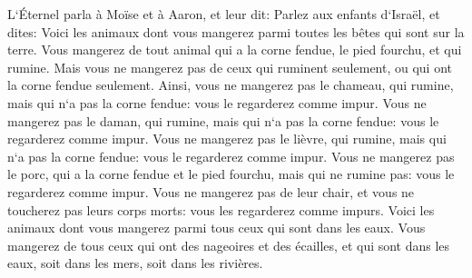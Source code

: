\verse L`Éternel parla à Moïse et à Aaron, et leur dit: 
\verse Parlez aux enfants d`Israël, et dites: Voici les animaux dont vous mangerez parmi toutes les bêtes qui sont sur la terre. 
\verse Vous mangerez de tout animal qui a la corne fendue, le pied fourchu, et qui rumine. 
\verse Mais vous ne mangerez pas de ceux qui ruminent seulement, ou qui ont la corne fendue seulement. Ainsi, vous ne mangerez pas le chameau, qui rumine, mais qui n`a pas la corne fendue: vous le regarderez comme impur. 
\verse Vous ne mangerez pas le daman, qui rumine, mais qui n`a pas la corne fendue: vous le regarderez comme impur. 
\verse Vous ne mangerez pas le lièvre, qui rumine, mais qui n`a pas la corne fendue: vous le regarderez comme impur. 
\verse Vous ne mangerez pas le porc, qui a la corne fendue et le pied fourchu, mais qui ne rumine pas: vous le regarderez comme impur. 
\verse Vous ne mangerez pas de leur chair, et vous ne toucherez pas leurs corps morts: vous les regarderez comme impurs. 
\verse Voici les animaux dont vous mangerez parmi tous ceux qui sont dans les eaux. Vous mangerez de tous ceux qui ont des nageoires et des écailles, et qui sont dans les eaux, soit dans les mers, soit dans les rivières. 
